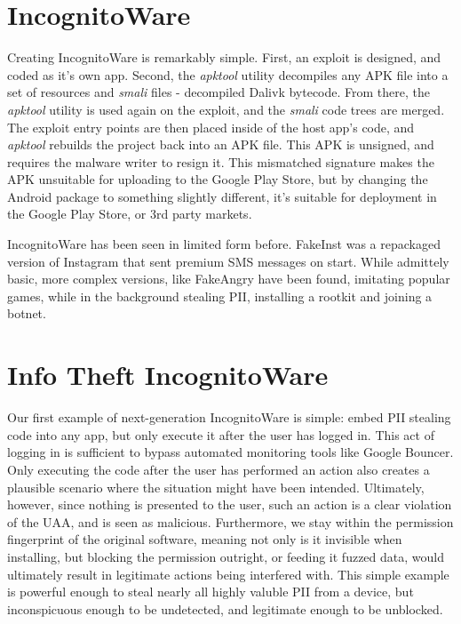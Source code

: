 \section{IncognitoWare}
Creating IncognitoWare is remarkably simple. First, an exploit is designed, and coded as it's own app. Second, the \textit{apktool}\citep{apktool} utility decompiles any APK file into a set of resources and \textit{smali} files - decompiled Dalivk bytecode. From there, the \textit{apktool} utility is used again on the exploit, and the \textit{smali} code trees are merged. The exploit entry points are then placed inside of the host app's code, and \textit{apktool} rebuilds the project back into an APK file. This APK is unsigned, and requires the malware writer to resign it. This mismatched signature makes the APK unsuitable for uploading to the Google Play Store, but by changing the Android package to something slightly different, it's suitable for deployment in the Google Play Store, or 3rd party markets.

IncognitoWare has been seen in limited form before. FakeInst\citep{avastfakeinst} was a repackaged version of Instagram\citep{instagramandroid} that sent premium SMS messages on start. While admittely basic, more complex versions, like FakeAngry\citep{fakeangry} have been found, imitating popular games, while in the background stealing PII, installing a rootkit and joining a botnet.

\section{Info Theft IncognitoWare}
Our first example of next-generation IncognitoWare is simple: embed PII stealing code into any app, but only execute it after the user has logged in. This act of logging in is sufficient to bypass automated monitoring tools like Google Bouncer. Only executing the code after the user has performed an action also creates a plausible scenario where the situation might have been intended. Ultimately, however, since nothing is presented to the user, such an action is a clear violation of the UAA, and is seen as malicious. Furthermore, we stay within the permission fingerprint of the original software, meaning not only is it invisible when installing, but blocking the permission outright, or feeding it fuzzed data, would ultimately result in legitimate actions being interfered with. This simple example is powerful enough to steal nearly all highly valuble PII from a device, but inconspicuous enough to be undetected, and legitimate enough to be unblocked.

